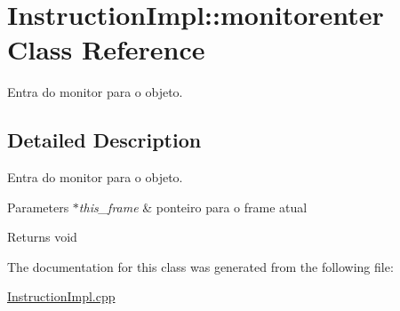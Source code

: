 \hypertarget{class_instruction_impl_1_1monitorenter}{}\section{Instruction\+Impl\+:\+:monitorenter Class Reference}
\label{class_instruction_impl_1_1monitorenter}


Entra do monitor para o objeto.  




\subsection{Detailed Description}
Entra do monitor para o objeto. 


\begin{DoxyParams}{Parameters}
{\em $\ast$this\+\_\+frame} & ponteiro para o frame atual \\
\hline
\end{DoxyParams}
\begin{DoxyReturn}{Returns}
void 
\end{DoxyReturn}


The documentation for this class was generated from the following file\+:\begin{DoxyCompactItemize}
\item 
\hyperlink{_instruction_impl_8cpp}{Instruction\+Impl.\+cpp}\end{DoxyCompactItemize}
